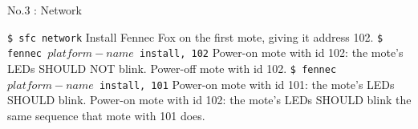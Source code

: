 \documentclass[11pt]{article}
\begin{document}
\begin{center}
{\large No.3 : Network}
\end{center}
\vspace{1cm}
	\texttt{\$ sfc network} \newline
	Install Fennec Fox on the first mote, giving it address 102.\newline
	\texttt{\$ fennec $platform-name$ install, 102}\newline
	Power-on mote with id 102: the mote's LEDs SHOULD NOT blink.\newline
	Power-off mote with id 102.\newline
	\texttt{\$ fennec $platform-name$ install, 101}\newline
	Power-on mote with id 101: the mote's LEDs SHOULD blink.\newline
	Power-on mote with id 102: the mote's LEDs SHOULD blink the same 
	sequence that mote with 101 does.\newline

\vspace{1cm}
\newpage
\end{document}
